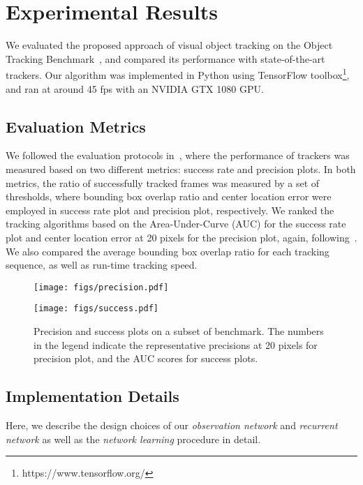 \documentclass[10pt,twocolumn,letterpaper]{article}
\begin{document}
\section{Experimental Results}
\label{sec:exp}

We evaluated the proposed approach of visual object tracking on the Object Tracking Benchmark~\cite{wu2015object}, and compared its performance with state-of-the-art trackers. Our algorithm was implemented in Python using TensorFlow toolbox\footnote{https://www.tensorflow.org/}, and ran at around 45 fps with an NVIDIA GTX 1080 GPU.

\subsection{Evaluation Metrics}
We followed the evaluation protocols in~\cite{wu2013online}, where the performance of trackers was measured based on two different metrics: success rate and precision plots. In both metrics, the ratio of successfully tracked frames was measured by a set of thresholds, where bounding box overlap ratio and center location error were employed in success rate plot and precision plot, respectively. We ranked the tracking algorithms based on the Area-Under-Curve (AUC) for the success rate plot and center location error at 20 pixels for the precision plot, again, following~\cite{wu2013online}. We also compared the average bounding box overlap ratio for each tracking sequence, as well as run-time tracking speed.

\begin{figure}[t]
\begin{center}
   \texttt{[image: figs/precision.pdf]}
   
   \texttt{[image: figs/success.pdf]}
\end{center}
   \caption{Precision and success plots on a subset of benchmark. The numbers in the legend indicate the representative precisions at 20 pixels for precision plot, and the AUC scores for success plots.}
\label{fig:OPE_benchmark}
\end{figure}

\subsection{Implementation Details}
Here, we describe the design choices of our \emph{observation network} and \emph{recurrent network} as well as the \emph{network learning} procedure in detail.
\end{document}
